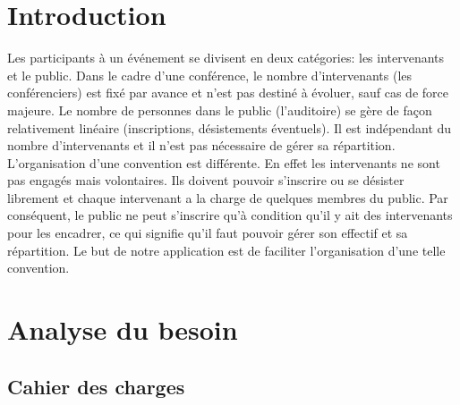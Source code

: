 \documentclass[11pt]{article}
\begin{document}

\renewcommand{\contentsname}{Sommaire}
\tableofcontents
\newpage



\section*{Introduction}

Les participants à un événement se divisent en deux catégories: les intervenants et le public. Dans le cadre d'une conférence, le nombre d'intervenants (les conférenciers) est fixé par avance et n'est pas destiné à évoluer, sauf cas de force majeure. Le nombre de personnes dans le public (l'auditoire) se gère de façon relativement linéaire (inscriptions, désistements éventuels). Il est indépendant du nombre d'intervenants et il n'est pas nécessaire de gérer sa répartition.\\

L'organisation d'une convention est différente. En effet les intervenants ne sont pas engagés mais volontaires. Ils doivent pouvoir s'inscrire ou se désister librement et chaque intervenant a la charge de quelques membres du public. Par conséquent, le public ne peut s'inscrire qu'à condition qu'il y ait des intervenants pour les encadrer, ce qui signifie qu'il faut pouvoir gérer son effectif et sa répartition. Le but de notre application est de faciliter l'organisation d'une telle convention. \\



\newpage


\section{Analyse du besoin}

\subsection{Cahier des charges}
\end{document}
